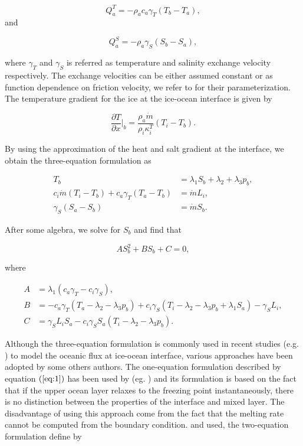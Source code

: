 \documentclass[11pt,a4paper]{article}
\begin{document}
		\begin{equation}
			Q_a^T = -\rho_a c_a\gamma_T(T_b-T_a),
		\end{equation}
		 and 
		 
		\begin{equation}
			Q_a^S = -\rho_a\gamma_S(S_b-S_a),
		\end{equation}
		
		\noindent where $\gamma_T$ and $\gamma_S$ is referred as temperature and salinity exchange velocity respectively. The exchange velocities can be either assumed constant or as function dependence on friction velocity, we refer to \citep{holland1999modeling} for their parameterization. The temperature gradient for the ice at the ice-ocean interface is given by
		
		\begin{equation}
			\label{eq:16}
			\dfrac{\partial T}{\partial x}\bigg|_b = \dfrac{\rho_a\dot{m}}{\rho_i\kappa_i^T}\left( T_i-T_b\right).
		\end{equation}
	
		By using the approximation of the heat and salt gradient at the interface, we obtain the three-equation formulation as
		
		\begin{align}
			T_b &= \lambda_1 S_b+\lambda_2+\lambda_3p_b,\\
			c_i\dot{m}\left(T_i-T_b\right) + c_a\gamma_T(T_a-T_b)& = \dot{m}L_i,\\
			\gamma_S(S_a-S_b) & = \dot{m}S_b.
		\end{align}
	
		\noindent After some algebra, we solve for $S_b$ and find that
		
		\begin{equation}
			AS_b^2 + BS_b + C = 0,
		\end{equation}
		
		\noindent where
		
	\begin{align*}
		A &= \lambda_1(c_a\gamma_T-c_i\gamma_S),\\
		B &= -c_a\gamma_T(T_a-\lambda_2-\lambda_3p_b) + c_i\gamma_S(T_i-\lambda_2-\lambda_3p_b+\lambda_1S_a)-\gamma_SL_i,\\
		C &= \gamma_SL_iS_a-c_i\gamma_SS_a(T_i-\lambda_2-\lambda_3p_b).
	\end{align*}
	
	Although the three-equation formulation is commonly used in recent studies (e.g. \cite{gayen2016simulation, gwyther2020vertical}) to model the oceanic flux at ice-ocean interface, various approaches have been adopted by some others authors. The one-equation formulation described by equation $(\ref{eq:1})$ has been used by (eg. \cite{jenkins1991ice,holland1998parameterization}) and its formulation is based on the fact that if the upper ocean layer relaxes to the freezing point instantaneously, there is no distinction between the properties of the interface and mixed layer. The disadvantage of using this approach come from the fact that the melting rate cannot be computed from the boundary condition. \cite{jenkins2010observation} and \cite{jenkins2011convection} used, the two-equation formulation define by 
	
\end{document}
